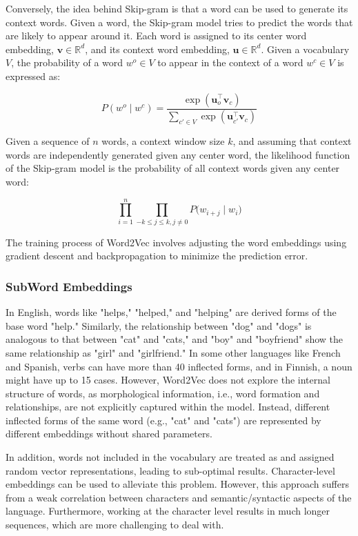 Conversely, the idea behind Skip-gram is that a word can be used to generate its context words. Given a word, the Skip-gram model tries to predict the words that are likely to appear around it. Each word is assigned to its center word embedding, $\bm{v} \in \mathbb{R}^{d}$, and its context word embedding, $\bm{u} \in \mathbb{R}^{d}$. Given a vocabulary $V$, the  probability of a word $w^o \in V$ to appear in the context of a word $w^c \in V$ is expressed as:

\begin{equation}
    P(w^o \mid w^c) = \frac{\exp (\bm{u}_{o}^{\top}\bm{v}_{c})}{\sum_{c' \in V} \exp (\bm{u}_{c'}^{\top} \bm{v}_{c})}
\end{equation}

Given a sequence of $n$ words, a context window size $k$, and assuming that context words are independently generated given any center word, the likelihood function of the Skip-gram model is the probability of all context words given any center word:

\begin{equation}
    \prod_{i=1}^n \prod_{-k \leq j \leq k, j \neq 0} P\bigl(w_{i+j} \mid w_i \bigr)
\end{equation}


The training process of Word2Vec involves adjusting the word embeddings using gradient descent and backpropagation to minimize the prediction error. 
 
\subsubsection{SubWord Embeddings}

In English, words like "helps," "helped," and "helping" are derived forms of the base word "help." Similarly, the relationship between "dog" and "dogs" is analogous to that between "cat" and "cats," and "boy" and "boyfriend" show the same relationship as "girl" and "girlfriend." In some other languages like French and Spanish, verbs can have more than 40 inflected forms, and in Finnish, a noun might have up to 15 cases. However, Word2Vec does not explore the internal structure of words, as morphological information, i.e., word formation and relationships, are not explicitly captured within the model. Instead, different inflected forms of the same word (e.g., "cat" and "cats") are represented by different embeddings without shared parameters. 

In addition, words not included in the vocabulary are treated as  and assigned random vector representations, leading to sub-optimal results. Character-level embeddings \citep{wehrmann2017character} can be used to alleviate this problem. However, this approach suffers from a weak correlation between characters and semantic/syntactic aspects of the language. Furthermore, working at the character level results in much longer sequences, which are more challenging to deal with.

